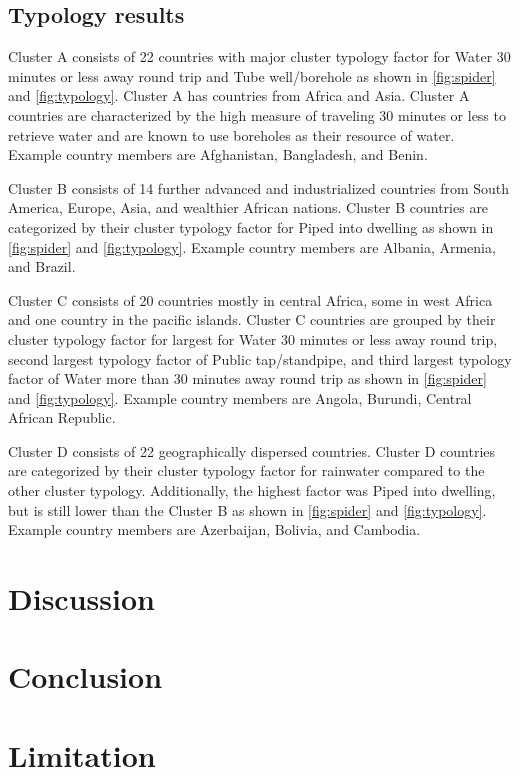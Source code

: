 \documentclass[10pt,twoside]{article}
\numberwithin{equation}{section}
\newcommand{\?}{\stackrel{?}{=}}
\begin{document}
\subsection{Typology results}
Cluster A consists of 22 countries with major cluster typology factor for Water 30 minutes or less away round trip and Tube well/borehole as shown in \autoref{fig:spider} and \autoref{fig:typology}. Cluster A has countries from Africa and Asia. Cluster A countries are characterized by the high measure of traveling 30 minutes or less to retrieve water and are known to use boreholes as their resource of water. Example country members are Afghanistan, Bangladesh, and Benin. 

Cluster B consists of 14 further advanced and industrialized countries from South America, Europe, Asia, and wealthier African nations. Cluster B countries are categorized by their cluster typology factor for Piped into dwelling as shown in \autoref{fig:spider} and \autoref{fig:typology}. Example country members are Albania, Armenia, and Brazil. 

Cluster C consists of 20 countries mostly in central Africa, some in west Africa and one country in the pacific islands. Cluster C countries are grouped by their cluster typology factor for largest for Water 30 minutes or less away round trip, second largest typology factor of Public tap/standpipe, and third largest typology factor of Water more than 30 minutes away round trip as shown in \autoref{fig:spider} and \autoref{fig:typology}. Example country members are Angola, Burundi, Central African Republic. 

Cluster D consists of 22 geographically dispersed countries. Cluster D countries are categorized by their cluster typology factor for rainwater compared to the other cluster typology. Additionally, the highest factor was Piped into dwelling, but is still lower than the Cluster B as shown in \autoref{fig:spider} and \autoref{fig:typology}. Example country members are Azerbaijan, Bolivia, and Cambodia.  


\section{Discussion}

\section{Conclusion}

\section{Limitation}

\printbibliography
\end{document}
